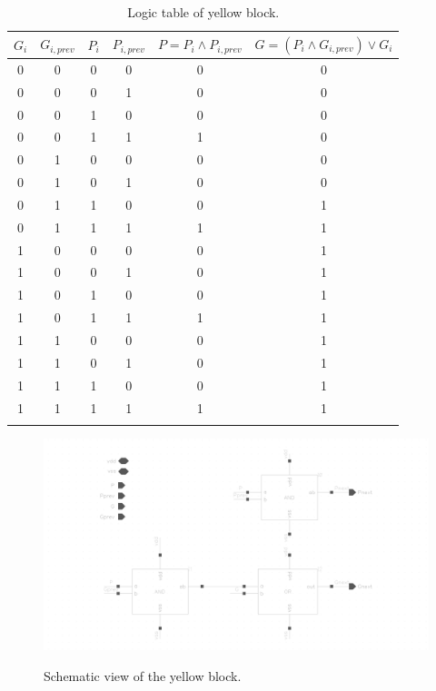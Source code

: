 \begin{table}[H]
  \caption{Logic table of yellow block.}
  \centering
  \begin{tabular}{cccc|cc}
    \toprule
    $G_i$ & $G_{i,prev}$ & $P_i$ & $P_{i,prev}$ & $P=P_i \wedge P_{i,prev}$ & $G=(P_i \wedge G_{i,prev}) \vee G_i$ \\
    \midrule
    0 & 0 & 0 & 0 & 0 & 0 \\
    0 & 0 & 0 & 1 & 0 & 0 \\
    0 & 0 & 1 & 0 & 0 & 0 \\
    0 & 0 & 1 & 1 & 1 & 0 \\
    0 & 1 & 0 & 0 & 0 & 0 \\
    0 & 1 & 0 & 1 & 0 & 0 \\
    0 & 1 & 1 & 0 & 0 & 1 \\
    0 & 1 & 1 & 1 & 1 & 1 \\
    1 & 0 & 0 & 0 & 0 & 1 \\
    1 & 0 & 0 & 1 & 0 & 1 \\
    1 & 0 & 1 & 0 & 0 & 1 \\
    1 & 0 & 1 & 1 & 1 & 1 \\
    1 & 1 & 0 & 0 & 0 & 1 \\
    1 & 1 & 0 & 1 & 0 & 1 \\
    1 & 1 & 1 & 0 & 0 & 1 \\
    1 & 1 & 1 & 1 & 1 & 1 \\
    \bottomrule
    \label{tab:yellow}
  \end{tabular}
\end{table}

\begin{figure}[H]
  \centering
  \captionsetup{justification=centering}
  {\includegraphics[width=1.3\textwidth]{../figures/yellow}}
  \caption{Schematic view of the yellow block.} \label{fig:yellow}
\end{figure}

